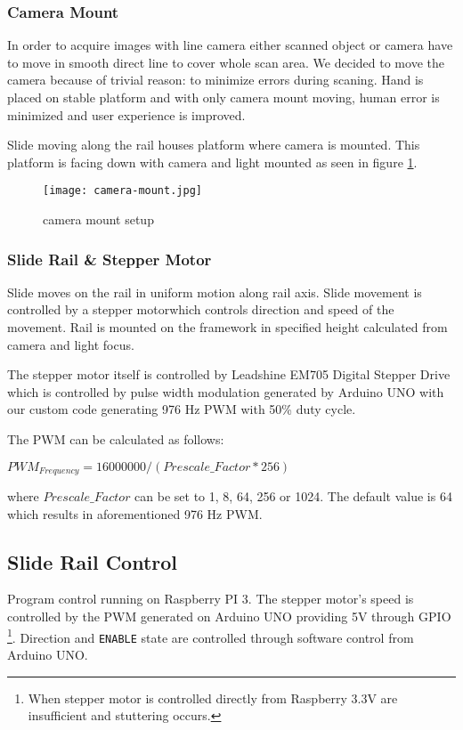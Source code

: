 \subsubsection*{Camera Mount}
In order to acquire images with line camera either scanned object or camera have to move in smooth direct line to cover whole scan area.
We decided to move the camera because of trivial reason: to minimize errors during scaning. Hand is placed on stable platform and with only camera mount moving,
human error is minimized and user experience is improved.

Slide moving along the rail houses platform where camera is mounted. This platform is facing down with camera and light mounted as seen in figure \ref{fig:camera-mount}.

\begin{figure}[ht]
    \label{fig:camera-mount}
    \centering
    \texttt{[image: camera-mount.jpg]}
    \caption{camera mount setup}
\end{figure}


\subsubsection*{Slide Rail \& Stepper Motor}
Slide moves on the rail in uniform motion along rail axis. Slide movement is controlled by a stepper motorwhich controls direction and speed of the movement.
Rail is mounted on the framework in specified height calculated from camera and light focus.

The stepper motor itself is controlled by Leadshine EM705 Digital Stepper Drive which is controlled by pulse width modulation
generated by Arduino UNO with our custom code generating 976 Hz PWM with 50\% duty cycle.

The PWM can be calculated as follows:

${PWM}_{Frequency} = 16000000 / (Prescale\_Factor * 256)$

where $Prescale\_Factor$ can be set to 1, 8, 64, 256 or 1024. The default value is 64 which results in aforementioned 976 Hz PWM.

\subsection{Slide Rail Control}
Program control running on Raspberry PI 3.
The stepper motor's speed is controlled by the PWM generated on Arduino UNO providing 5V through GPIO
\footnote{When stepper motor is controlled directly from Raspberry 3.3V are insufficient and stuttering occurs.}.
Direction and \texttt{ENABLE} state are controlled through software control from Arduino UNO.

